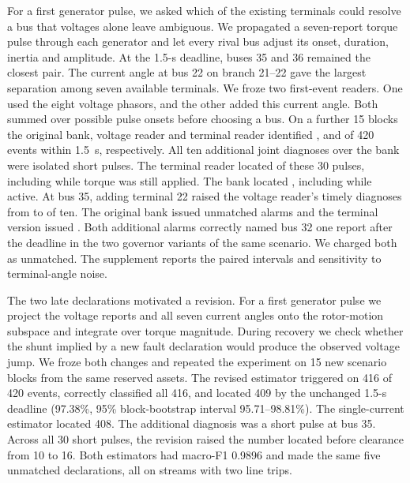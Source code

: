 For a first generator pulse, we asked which of the existing terminals
could resolve a bus that voltages alone leave ambiguous. We propagated
a seven-report torque pulse through each generator and let every rival
bus adjust its onset, duration, inertia and amplitude. At the 1.5-s
deadline, buses 35 and 36 remained the closest pair. The current angle
at bus 22 on branch 21--22 gave the largest separation among seven
available terminals. We froze two first-event readers. One used the
eight voltage phasors, and the other added this current angle. Both
summed over possible pulse onsets before choosing a bus. On a further
15 blocks the original bank, voltage reader and terminal reader
identified \TorqueBaseJoint{}, \TorqueVoltJoint{} and
\TorqueTermJoint{} of 420 events within 1.5~s, respectively. All ten
additional joint diagnoses over the bank were isolated short pulses.
The terminal reader located \TorqueTermShort{} of these 30 pulses,
including \TorqueTermShortActive{} while torque was still applied.
The bank located \TorqueBaseShort{}, including \TorqueBaseShortActive{}
while active. At bus 35, adding terminal 22 raised the voltage reader's
timely diagnoses from \TorqueVoltBusThirtyFive{} to
\TorqueTermBusThirtyFive{} of ten. The original bank issued
\TorqueBaseExtra{} unmatched alarms and the terminal version issued
\TorqueTermExtra{}. Both additional alarms correctly named bus 32 one
report after the deadline in the two governor variants of the same
scenario. We charged both as unmatched. The supplement reports the
paired intervals and sensitivity to terminal-angle noise.

The two late declarations motivated a revision. For a first generator
pulse we project the voltage reports and all seven current angles
onto the rotor-motion subspace and integrate over torque magnitude.
During recovery we check whether the shunt implied by a new fault
declaration would produce the observed voltage jump. We froze both
changes and repeated the experiment on 15 new scenario blocks from
the same reserved assets. The revised estimator triggered on 416 of
420 events, correctly classified all 416, and located 409 by the
unchanged 1.5-s deadline (97.38\%, 95\% block-bootstrap interval
95.71--98.81\%). The single-current estimator located 408. The
additional diagnosis was a short pulse at bus 35. Across all 30
short pulses, the revision raised the number located before clearance
from 10 to 16. Both estimators had macro-F1 0.9896 and made the
same five unmatched declarations, all on streams with two line trips.

